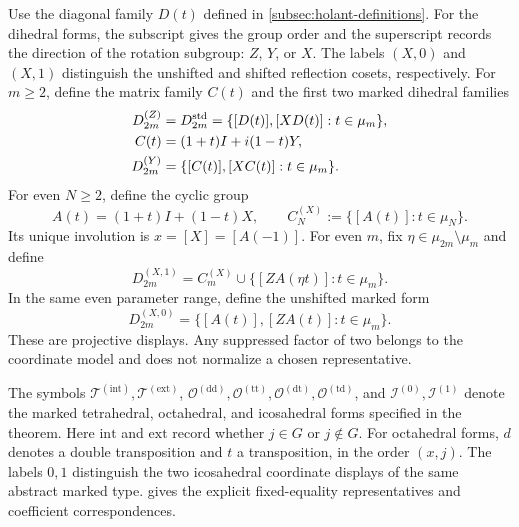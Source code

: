 \documentclass[11pt,letterpaper,onecolumn]{article}
\theoremstyle{plain}
\theoremstyle{definition}
\theoremstyle{remark}
\newcommand{\DihZ}[1]{{D_{#1}^{(Z)}}}
\newcommand{\DihY}[1]{{D_{#1}^{(Y)}}}
\newcommand{\DihXzero}[1]{{D_{#1}^{(X,0)}}}
\newcommand{\DihXone}[1]{{D_{#1}^{(X,1)}}}
\newcommand{\CycX}[1]{{C_{#1}^{(X)}}}
\newcommand{\TetInt}{{\mathcal T^{(\mathrm{int})}}}
\newcommand{\TetExt}{{\mathcal T^{(\mathrm{ext})}}}
\newcommand{\OctDD}{{\mathcal O^{(\mathrm{dd})}}}
\newcommand{\OctTT}{{\mathcal O^{(\mathrm{tt})}}}
\newcommand{\OctDT}{{\mathcal O^{(\mathrm{dt})}}}
\newcommand{\OctTD}{{\mathcal O^{(\mathrm{td})}}}
\newcommand{\IcoZero}{{\mathcal I^{(0)}}}
\newcommand{\IcoOne}{{\mathcal I^{(1)}}}
\begin{document}
Use the diagonal family \(D(t)\) defined in
\cref{subsec:holant-definitions}.
For the dihedral forms, the subscript gives the group order and the
superscript records the direction of the rotation subgroup: \(Z\), \(Y\),
or \(X\). The labels \((X,0)\) and \((X,1)\) distinguish the unshifted
and shifted reflection cosets, respectively.
For \(m\ge2\), define the matrix family \(C(t)\) and the first two marked
dihedral families
\begin{align*}
 \DihZ{2m}
 &=D_{2m}^{\rm std}=\{[D(t)],[XD(t)]:t\in\mu_m\},
 \\
 C(t)&=(1+t)I+i(1-t)Y,\\
 \DihY{2m}
 &=\{[C(t)],[XC(t)]:t\in\mu_m\}.
\end{align*}
For even \(N\ge2\), define the cyclic group
\[
 A(t)=(1+t)I+(1-t)X,\qquad \CycX{N}:=\{[A(t)]:t\in\mu_N\}.
\]
Its unique involution is \(x=[X]=[A(-1)]\).
For even \(m\), fix \(\eta\in\mu_{2m}\setminus\mu_m\) and define
\begin{equation*}
 \DihXone{2m}
 =
 \CycX{m}
 \cup
 \{[ZA(\eta t)]:t\in\mu_m\}.
\end{equation*}
In the same even parameter range, define the unshifted marked form
\begin{equation*}
 \DihXzero{2m}
 =
 \{[A(t)],[ZA(t)]:t\in\mu_m\}.
\end{equation*}
These are projective displays.  Any suppressed factor of two belongs to
the coordinate model and does not normalize a chosen representative.

The symbols \(\TetInt,\TetExt\),
\(\OctDD,\OctTT,\OctDT,\OctTD\), and
\(\IcoZero,\IcoOne\) denote the marked tetrahedral, octahedral,
and icosahedral forms specified in the theorem. Here \(\mathrm{int}\)
and \(\mathrm{ext}\) record whether \(j\in G\) or \(j\notin G\).
For octahedral forms, \(d\) denotes a double transposition and \(t\) a
transposition, in the order \((x,j)\). The labels \(0,1\) distinguish
the two icosahedral coordinate displays of the same abstract marked type.
 gives the explicit fixed-equality representatives
and coefficient correspondences.
\end{document}
